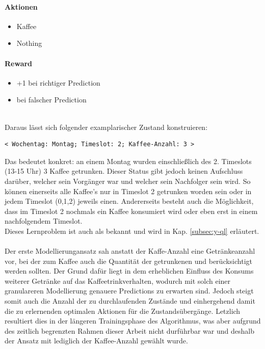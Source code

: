 \paragraph{Aktionen}
\begin{itemize}
	\item Kaffee
	\item Nothing
\end{itemize}

\paragraph{Reward}
\begin{itemize}
	\item +1 bei richtiger Prediction
	\item {} bei falscher Prediction
\end{itemize}
\ \\
Daraus lässt sich folgender examplarischer Zustand konstruieren: 
\begingroup
\makeatletter
\@totalleftmargin=0.5cm
\begin{Verbatim}
< Wochentag: Montag; Timeslot: 2; Kaffee-Anzahl: 3 >
\end{Verbatim}
\endgroup
Das bedeutet konkret: an einem Montag wurden einschließlich des 2. Timeslots (13-15 Uhr) 3 Kaffee getrunken. Dieser Status gibt jedoch keinen Aufschluss darüber, welcher sein Vorgänger war und welcher sein Nachfolger sein wird. So können einerseits alle Kaffee's nur in Timeslot 2 getrunken worden sein oder in jedem Timeslot (0,1,2) jeweils einen. Andererseits besteht auch die Möglichkeit, dass im Timeslot 2 nochmals ein Kaffee konsumiert wird oder eben erst in einem nachfolgendem Timeslot.\\
Dieses Lernproblem ist auch als  bekannt und wird in Kap. \ref{subsec:y-ql} erläutert.
\\\\
Der erste Modellierungansatz sah anstatt der Kaffe-Anzahl eine Getränkeanzahl vor, bei der zum Kaffee auch die Quantität der getrunkenen  und  berücksichtigt werden sollten. Der Grund dafür liegt in dem erheblichen Einfluss des Konsums weiterer Getränke auf das Kaffeetrinkverhalten, wodurch mit solch einer granulareren Modellierung genauere Predictions zu erwarten sind. Jedoch steigt somit auch die Anzahl der zu durchlaufenden Zustände und einhergehend damit die zu erlernenden optimalen Aktionen für die Zustandsübergänge. Letzlich resultiert dies in der längeren Trainingsphase des Algorithmus, was aber aufgrund des zeitlich begrenzten Rahmen dieser Arbeit nicht durführbar war und deshalb der Ansatz mit lediglich der Kaffee-Anzahl gewählt wurde.\\

